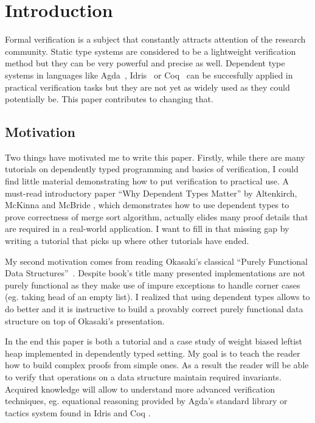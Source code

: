 \section{Introduction}

Formal verification is a subject that constantly attracts attention of the research community. Static type systems are considered to be a lightweight verification method but they can be very powerful and precise as well. Dependent type systems in languages like Agda~\cite{Nor07}, Idris~\cite{Bra13} or Coq~\cite{coq} can be succesfully applied in practical verification tasks but they are not yet as widely used as they could potentially be. This paper contributes to changing that.

\subsection{Motivation}

Two things have motivated me to write this paper. Firstly, while there are many tutorials on dependently typed programming and basics of verification, I could find little material demonstrating how to put verification to practical use. A must-read introductory paper ``Why Dependent Types Matter'' by Altenkirch, McKinna and McBride \cite{AltMcBMcK05}, which demonstrates how to use dependent types to prove correctness of merge sort algorithm, actually elides many proof details that are required in a real-world application. I want to fill in that missing gap by writing a tutorial that picks up where other tutorials have ended.

My second motivation comes from reading Okasaki's classical ``Purely Functional Data Structures''~\cite{Oka99}. Despite book's title many presented implementations are not purely functional as they make use of impure exceptions to handle corner cases (eg. taking head of an empty list). I realized that using dependent types allows to do better and it is instructive to build a provably correct purely functional data structure on top of Okasaki's presentation.

In the end this paper is both a tutorial and a case study of weight biased leftist heap implemented in dependently typed setting. My goal is to teach the reader how to build complex proofs from simple ones. As a result the reader will be able to verify that operations on a data structure maintain required invariants. Acquired knowledge will allow to understand more advanced verification techniques, eg. equational reasoning provided by Agda's standard library or tactics system found in Idris \cite{Bra13} and Coq \cite{coq}.

